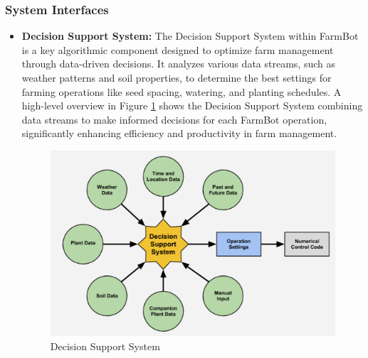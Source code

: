 \subsubsection{System Interfaces}
\begin{itemize}
    \item \textbf{Decision Support System:} The Decision Support System within FarmBot is a key algorithmic component designed to optimize farm management through data-driven decisions. It analyzes various data streams, such as weather patterns and soil properties, to determine the best settings for farming operations like seed spacing, watering, and planting schedules. A high-level overview in Figure \ref{Decision Support System} shows the Decision Support System combining data streams to make informed decisions for each FarmBot operation, significantly enhancing efficiency and productivity in farm management.

    \begin{figure}[htbp]
        \centering
        \includegraphics[width=1\linewidth]{Figures/dss.png}
        \caption{Decision Support System}
        \label{Decision Support System}
    \end{figure}
    

\end{itemize}
